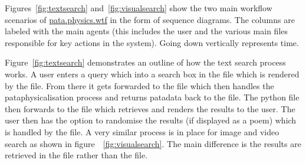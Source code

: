 Figures~\ref{fig:textsearch} and~\ref{fig:visualsearch} show the two main workflow scenarios of \url{pata.physics.wtf} in the form of sequence diagrams. The columns are labeled with the main agents (this includes the user and the various main files responsible for key actions in the system). Going down vertically represents time. 

Figure~\ref{fig:textsearch} demonstrates an outline of how the text search process works. A user enters a query which into a search box in the  file which is rendered by the  file. From there it gets forwarded to the  file which then handles the pataphysicalisation process and returns patadata back to the  file. The python file then forwards to the  file which retrieves and renders the results to the user. The user then has the option to randomise the results (if displayed as a poem) which is handled by the  file. A very similar process is in place for image and video search as shown in figure~~\ref{fig:visualsearch}. The main difference is the results are retrieved in the  file rather than the  file.


